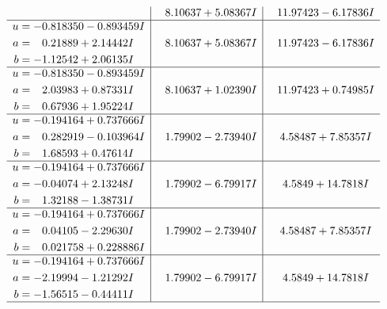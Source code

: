 \documentclass[1p]{elsarticle_modified}
\theoremstyle{definition}
\begin{document}
$$\begin{array}{c|c|c}
 & \phantom{-}8.10637 + 5.08367 I & \phantom{-}11.97423 - 6.17836 I \\ \hline\begin{aligned}
u &= -0.818350 - 0.893459 I \\
a &= \phantom{-}0.21889 + 2.14442 I \\
b &= -1.12542 + 2.06135 I\end{aligned}
 & \phantom{-}8.10637 + 5.08367 I & \phantom{-}11.97423 - 6.17836 I \\ \hline\begin{aligned}
u &= -0.818350 - 0.893459 I \\
a &= \phantom{-}2.03983 + 0.87331 I \\
b &= \phantom{-}0.67936 + 1.95224 I\end{aligned}
 & \phantom{-}8.10637 + 1.02390 I & \phantom{-}11.97423 + 0.74985 I \\ \hline\begin{aligned}
u &= -0.194164 + 0.737666 I \\
a &= \phantom{-}0.282919 - 0.103964 I \\
b &= \phantom{-}1.68593 + 0.47614 I\end{aligned}
 & \phantom{-}1.79902 - 2.73940 I & \phantom{-}4.58487 + 7.85357 I \\ \hline\begin{aligned}
u &= -0.194164 + 0.737666 I \\
a &= -0.04074 + 2.13248 I \\
b &= \phantom{-}1.32188 - 1.38731 I\end{aligned}
 & \phantom{-}1.79902 - 6.79917 I & \phantom{-}4.5849 + 14.7818 I \\ \hline\begin{aligned}
u &= -0.194164 + 0.737666 I \\
a &= \phantom{-}0.04105 - 2.29630 I \\
b &= \phantom{-}0.021758 + 0.228886 I\end{aligned}
 & \phantom{-}1.79902 - 2.73940 I & \phantom{-}4.58487 + 7.85357 I \\ \hline\begin{aligned}
u &= -0.194164 + 0.737666 I \\
a &= -2.19994 - 1.21292 I \\
b &= -1.56515 - 0.44411 I\end{aligned}
 & \phantom{-}1.79902 - 6.79917 I & \phantom{-}4.5849 + 14.7818 I\\
 \hline 
 \end{array}$$\newpage$$\begin{array}{c|c|c}  

\end{array}$$
\end{document}
